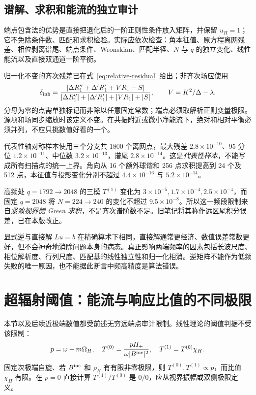 \subsection{谱解、求积和能流的独立审计}
端点包含法的优势是直接把退化后的一阶正则性条件放入矩阵，并保留 $u_H=1$；它不免除条件数、匹配和求积检验。实际应依次检查：角本征值、原方程离网残差、相位剥离谱尾、端点条件、Wronskian、匹配半径、$N$ 与 $q$ 的独立变化、线性能流以及直接双通道一阶平衡。

归一化不变的齐次残差已在式~\eqref{eq:relative-residual} 给出；非齐次场应使用
\begin{equation}
 \delta_{\rm inh}=
 \frac{|\Delta R_1''+\Delta'R_1'+VR_1-S|}
 {|\Delta R_1''|+|\Delta'R_1'|+|VR_1|+|S|},\qquad
 V=K^2/\Delta-\lambda.
\end{equation}
分母为零的点需单独标记而非除以任意固定常数；端点必须取解析正则变量极限。源项和场同步缩放时该定义不变。在共振附近或微小净能流下，绝对和相对平衡必须并列，不应只挑数值好看的一个。

代表性轴对称样本使用三个分支共 1800 个离网点，最大残差 $2.8\times10^{-10}$、95 分位 $1.2\times10^{-11}$、中位数 $3.2\times10^{-13}$，谱尾 $2.8\times10^{-14}$。这是\emph{代表性样本}，不能写成所有扫描点的统一上界。角向从 16 个额外球谐和 256 点求积提高到 24 个及 512 点，本征值与投影变化分别不超过 $4.4\times10^{-16}$ 与 $5.2\times10^{-14}$。

高频处 $q=1792\to2048$ 的三模 $T^{(1)}$ 变化为 $3\times10^{-5},1.7\times10^{-4},2.5\times10^{-4}$，而固定 $q=2048$ 将 $N=224\to240$ 的变化不超过 $9.5\times10^{-8}$。所以这一频段限制来自\emph{紧致视界侧 Green 求积}，不是齐次谱阶数不足。旧笔记将其称作远区尾积分误差，已在本版改正。

显式逆与直接解 $Lu=b$ 在精确算术下相同，直接解通常更经济、数值误差常数更好，但不会神奇地消除问题本身的病态。真正影响两端频率的因素包括长波尺度、相位解析度、行列尺度、匹配基的线性独立性和归一化相消。逆矩阵不能作为低频失败的唯一原因，也不能据此断言中频高精度是算法错误。

\section{超辐射阈值：能流与响应比值的不同极限}
本节以及后续近极端数值都受前述无穷远端点审计限制。线性理论的阈值判据不受该限制：
\begin{equation}
 p=\omega-m\Omega_H,\quad
 T^{(0)}=\frac{pH_+}{\omega|B^{\rm inc}|^2},\quad
 T^{(1)}=T^{(0)}\chi_H.
\end{equation}
固定次极端自旋、若 $B^{\rm inc}$ 和 $\rho_H$ 有有限非零极限，则 $T^{(0)},T^{(1)}\propto p$，而比值 $\chi_H$ 有限。在 $p=0$ 直接计算 $T^{(1)}/T^{(0)}$ 是 $0/0$，应从视界振幅或双侧极限定义。

